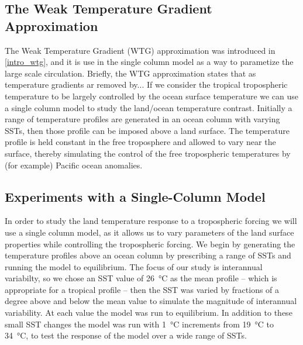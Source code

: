 \subsection{The Weak Temperature Gradient Approximation}
The Weak Temperature Gradient (WTG) approximation was introduced in 
\ref{intro_wtg}, and it is use in the single column model as a way to parametize 
the large scale circulation. Briefly, the WTG approximation states that as 
temperature gradients ar removed by... If we consider the tropical tropospheric 
temperature to be largely controlled by the ocean surface temperature we can use 
a single column model to study the land/ocean temperature contrast.  Initially a 
range of temperature profiles are generated in an ocean column with varying 
SSTs, then those profile can be imposed above a land surface.  The temperature 
profile is held constant in the free troposphere and allowed to vary near the 
surface, thereby simulating the control of the free tropospheric temperatures by 
(for example) Pacific ocean anomalies.


\subsection{Experiments with a Single-Column Model}
\label{mech_scm}
In order to study the land temperature response to a tropospheric forcing we 
will use a single column model, as it allows us to vary parameters of the land 
surface properties while controlling the tropospheric forcing.  We begin by 
generating the temperature profiles above an ocean column by prescribing a range 
of SSTs and running the model to equilibrium.  The focus of our study is 
interannual variabilty, so we chose an SST value of \SI{26}{\degreeCelsius} as 
the mean profile -- which is appropriate for a tropical profile -- then the SST 
was varied by fractions of a degree above and below the mean value to simulate 
the magnitude of interannual variability. At each value the model was run to 
equilibrium.  In addition to these small SST changes the model was run with 
\SI{1}{\degreeCelsius} increments from \SI{19}{\degreeCelsius} to 
\SI{34}{\degreeCelsius}, to test the response of the model over a wide range of 
SSTs.

